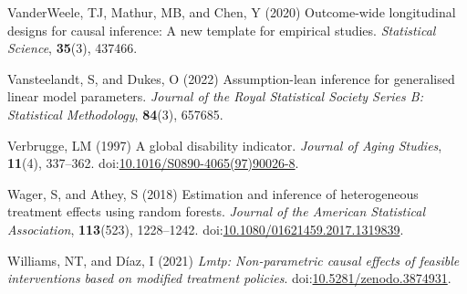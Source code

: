 \documentclass[
  singlecolumn]{article}
\newlength{\cslhangindent}
\newenvironment{CSLReferences}[2] %
 {\begin{list}{}{%
  \setlength{\itemindent}{0pt}
  \setlength{\leftmargin}{0pt}
  \setlength{\parsep}{0pt}
  \ifodd #1
   \setlength{\leftmargin}{\cslhangindent}
   \setlength{\itemindent}{-1\cslhangindent}
  \fi
  \setlength{\itemsep}{#2\baselineskip}}}
 {\end{list}}
\begin{document}
\begin{CSLReferences}{1}{0}
VanderWeele, TJ, Mathur, MB, and Chen, Y (2020) Outcome-wide
longitudinal designs for causal inference: A new template for empirical
studies. \emph{Statistical Science}, \textbf{35}(3), 437466.

Vansteelandt, S, and Dukes, O (2022) Assumption-lean inference for
generalised linear model parameters. \emph{Journal of the Royal
Statistical Society Series B: Statistical Methodology}, \textbf{84}(3),
657685.

Verbrugge, LM (1997) A global disability indicator. \emph{Journal of
Aging Studies}, \textbf{11}(4), 337--362.
doi:\href{https://doi.org/10.1016/S0890-4065(97)90026-8}{10.1016/S0890-4065(97)90026-8}.

Wager, S, and Athey, S (2018) Estimation and inference of heterogeneous
treatment effects using random forests. \emph{Journal of the American
Statistical Association}, \textbf{113}(523), 1228--1242.
doi:\href{https://doi.org/10.1080/01621459.2017.1319839}{10.1080/01621459.2017.1319839}.

Williams, NT, and Díaz, I (2021) \emph{Lmtp: Non-parametric causal
effects of feasible interventions based on modified treatment policies}.
doi:\href{https://doi.org/10.5281/zenodo.3874931}{10.5281/zenodo.3874931}.

\end{CSLReferences}
\end{document}
